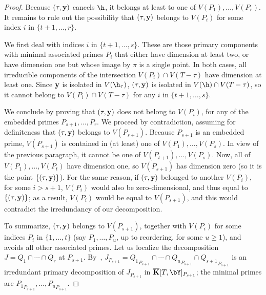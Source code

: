 \documentclass[12pt]{article}
\begin{document}
\begin{proof}
  Because $(\tau,\mathbf{y})$ cancels $\h$, it belongs at least to one of
  $V(P_1),\dots,V(P_r)$. It remains to rule out the possibility that
  $(\tau,\mathbf{y})$ belongs to $V(P_i)$ for some index $i$ in
  $\{t+1,\dots,r\}$.

  We first deal with indices $i$ in $\{t+1,\dots,s\}$. These are those
  primary components with minimal associated primes $P_i$ that either
  have dimension at least two, or have dimension one but whose image
  by $\pi$ is a single point. In both cases, all irreducible
  components of the intersection $V(P_i)\cap V(T-\tau)$ have dimension
  at least one. Since $\mathbf{y}$ is isolated in $V(\h_\tau)$, $(\tau,\mathbf{y})$ is
  isolated in $V(\h)\cap V(T-\tau)$, so it cannot belong to
  $V(P_i)\cap V(T-\tau)$ for any $i$ in $\{t+1,\dots,s\}$.
  
  We conclude by proving that $(\tau,\mathbf{y})$ does not belong to $V(P_i)$,
  for any of the embedded primes $P_{s+1},\dots,P_r$. We proceed by
  contradiction, assuming for definiteness that $(\tau,\mathbf{y})$ belongs to
  $V(P_{s+1})$. Because $P_{s+1}$ is an embedded prime, $V(P_{s+1})$
  is contained in (at least) one of $V(P_1),\dots,V(P_s)$. In view of
  the previous paragraph, it cannot be one of
  $V(P_{t+1}),\dots,V(P_s)$.  Now, all of $V(P_1),\dots,V(P_t)$ have
  dimension one, so $V(P_{s+1})$ has dimension zero (so it is the point $\{(\tau,\mathbf{y})\}$). For the same
  reason, if $(\tau,\mathbf{y})$ belonged to another $V(P_i)$, for some $i >
  s+1$, $V(P_i)$ would also be zero-dimensional, and thus equal to $\{(\tau,\mathbf{y})\}$; as a result, $V(P_i)$
  would be equal to $V(P_{s+1})$, and this would contradict the
  irredundancy of our decomposition.
  
  To summarize, $(\tau,\mathbf{y})$ belongs to $V(P_{s+1})$, together with
  $V(P_i)$ for some indices $P_i$ in $\{1,\dots,t\}$ (say
  $P_1,\dots,P_u$, up to reordering, for some $u \ge 1$), and avoids
  all other associated primes.  Let us localize the decomposition
  $J=Q_1 \cap \cdots \cap Q_r$ at
  $P_{s+1}$. By~\cite[Proposition~4.9]{AtMc},
  $J_{P_{s+1}}={Q_1}_{P_{s+1}} \cap \cdots \cap {Q_u}_{P_{s+1}}\cap
  {Q_{s+1}}_{P_{s+1}}$ is an irredundant primary decomposition of
  $J_{P_{s+1}}$ in $\KKbar[T,\bY]_{P_{s+1}}$; the minimal primes are
  ${P_1}_{P_{s+1}},\dots,{P_u}_{P_{s+1}}$.


\end{proof}
\end{document}

